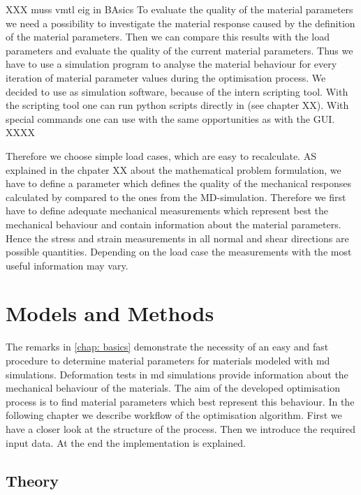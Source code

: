
XXX muss vmtl eig in BAsics
To evaluate the quality of the material parameters we need a possibility to investigate the material response caused by the definition of the material parameters. Then we can compare this results with the load parameters and evaluate the quality of the current material parameters. Thus we have to use a simulation program to analyse the material behaviour for every iteration of material parameter values during the optimisation process. We decided to use  as simulation software, because of the intern scripting tool. With the  scripting tool one can run python scripts directly in  (see chapter XX). With special  commands one can use  with the same opportunities as with the GUI. 
XXXX

Therefore we choose simple load cases, which are easy to recalculate. AS explained in the chpater XX about the mathematical problem formulation, we have to define a parameter which defines the quality of the mechanical responses calculated by  compared to the ones from the MD-simulation. Therefore we first have to define adequate mechanical measurements which represent best the mechanical behaviour and contain information about the material parameters. Hence the stress and strain measurements in all normal and shear directions are possible quantities. Depending on the load case the measurements with the most useful information may vary.



\chapter{Models and Methods} \label{chap: modelsAndMethods}

The remarks in \autoref{chap: basics} demonstrate the necessity of an easy and fast procedure to determine material parameters for materials modeled with \acrshort{md} simulations. Deformation tests in \acrshort{md} simulations provide information about the mechanical behaviour of the materials. The aim of the developed optimisation process is to find material parameters which best represent this behaviour.
In the following chapter we describe workflow of the optimisation algorithm. First we have a closer look at the structure of the process. Then we introduce the required input data. At the end the implementation is explained. 

\section{Theory} \label{sec: methodTheory}

